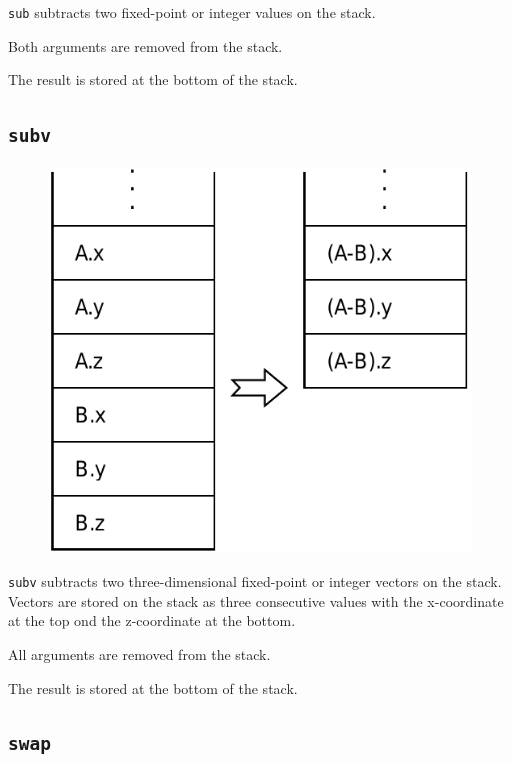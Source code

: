 			\texttt{sub} subtracts two fixed-point or integer values on the
			stack.
			
			Both arguments are removed from the stack.
			
			The result is stored at the bottom of the stack.
	
	\qquad
	
	\subsection*{\texttt{subv}}
	
		\begin{figure}
			\begin{flushright}
				\includegraphics[width=\linewidth]{figure/pdf/i_subv} 
			\end{flushright}
		\end{figure}
	
			\texttt{subv} subtracts two three-dimensional fixed-point or
			integer vectors on the stack. Vectors are stored on the stack as
			three consecutive values with the x-coordinate at the top ond the
			z-coordinate at the bottom.
			
			All arguments are removed from the stack.
			
			The result is stored at the bottom of the stack.
	
	\qquad\qquad 
	
	\subsection*{\texttt{swap}}
	
